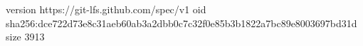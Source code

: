version https://git-lfs.github.com/spec/v1
oid sha256:dce722d73e8c31aeb60ab3a2dbb0c7c32f0e85b3b1822a7bc89e8003697bd31d
size 3913
